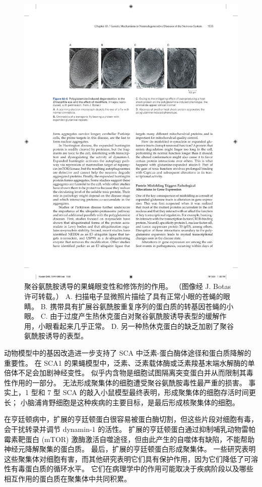 \begin{figure}[htbp]
	\centering
	\includegraphics[width=0.7\linewidth]{chap63/fig_63_5}
	\caption{聚谷氨酰胺诱导的果蝇眼变性和修饰剂的作用。 （图像经 J. Botas 许可转载。） A. 扫描电子显微照片描绘了具有正常小眼的苍蝇的眼睛。 B. 携带具有扩展谷氨酰胺重复序列的蛋白质的转基因苍蝇的小眼。 C. 由于过度产生热休克蛋白对聚谷氨酰胺诱导表型的缓解作用，小眼看起来几乎正常。 D. 另一种热休克蛋白的缺乏加剧了聚谷氨酰胺诱导的表型。}
	\label{fig:63_5}
\end{figure}

动物模型中的基因改造进一步支持了 SCA 中泛素-蛋白酶体途径和蛋白质降解的重要性。 在 SCA1 的果蝇模型中，泛素、泛素载体酶或泛素羧基末端水解酶的单倍体不足会加剧神经变性。 似乎内含物是细胞试图隔离突变蛋白并从而限制其毒性作用的一部分。 无法形成聚集体的细胞遭受聚谷氨酰胺毒性最严重的损害。 事实上，1 型和 7 型 SCA 的敲入小鼠模型最终表明，形成聚集体的细胞存活时间更长； 小脑浦肯野细胞是这种疾病的主要目标，是最后形成核聚集体的细胞。

在亨廷顿病中，扩展的亨廷顿蛋白很容易被蛋白酶切割，但这些片段对细胞有毒，会干扰转录并调节 dynamin-1 的活性。 扩展的亨廷顿蛋白通过抑制哺乳动物雷帕霉素靶蛋白 (mTOR) 激酶激活自噬途径，但由此产生的自噬体有缺陷，不能帮助神经元降解聚集的蛋白质。 最后，扩展的亨廷顿蛋白形成聚集体。 一些研究表明这些聚集体对细胞有害，而其他研究表明它们具有保护作用，因为它们降低了可溶性有毒蛋白质的循环水平。 它们在病理学中的作用可能取决于疾病阶段以及哪些相互作用的蛋白质在聚集体中共同积累。

